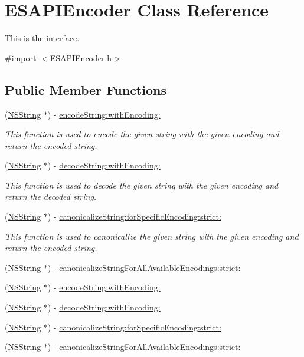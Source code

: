 \hypertarget{a00001}{
\section{ESAPIEncoder Class Reference}
\label{d8/d84/a00001}
}


This is the interface.  




{\ttfamily \#import $<$ESAPIEncoder.h$>$}

\subsection*{Public Member Functions}
\begin{DoxyCompactItemize}
\item 
(\hyperlink{a00003}{NSString} $\ast$) -\/ \hyperlink{a00001_ab5c2f76d076134d64c4e547bf0cf282a}{encodeString:withEncoding:}
\begin{DoxyCompactList}\small\item\em This function is used to encode the given string with the given encoding and return the encoded string. \end{DoxyCompactList}\item 
(\hyperlink{a00003}{NSString} $\ast$) -\/ \hyperlink{a00001_a6926a8a8a6813154b7550ac018c73dde}{decodeString:withEncoding:}
\begin{DoxyCompactList}\small\item\em This function is used to decode the given string with the given encoding and return the decoded string. \end{DoxyCompactList}\item 
(\hyperlink{a00003}{NSString} $\ast$) -\/ \hyperlink{a00001_a4857fc98d2991953378a93a7b4dee5ca}{canonicalizeString:forSpecificEncoding:strict:}
\begin{DoxyCompactList}\small\item\em This function is used to canonicalize the given string with the given encoding and return the encoded string. \end{DoxyCompactList}\item 
(\hyperlink{a00003}{NSString} $\ast$) -\/ \hyperlink{a00001_a0235404f388683e1e078796722398060}{canonicalizeStringForAllAvailableEncodings:strict:}
\item 
(\hyperlink{a00003}{NSString} $\ast$) -\/ \hyperlink{a00001_ab5c2f76d076134d64c4e547bf0cf282a}{encodeString:withEncoding:}
\item 
(\hyperlink{a00003}{NSString} $\ast$) -\/ \hyperlink{a00001_a6926a8a8a6813154b7550ac018c73dde}{decodeString:withEncoding:}
\item 
(\hyperlink{a00003}{NSString} $\ast$) -\/ \hyperlink{a00001_a4857fc98d2991953378a93a7b4dee5ca}{canonicalizeString:forSpecificEncoding:strict:}
\item 
(\hyperlink{a00003}{NSString} $\ast$) -\/ \hyperlink{a00001_a0235404f388683e1e078796722398060}{canonicalizeStringForAllAvailableEncodings:strict:}
\end{DoxyCompactItemize}



